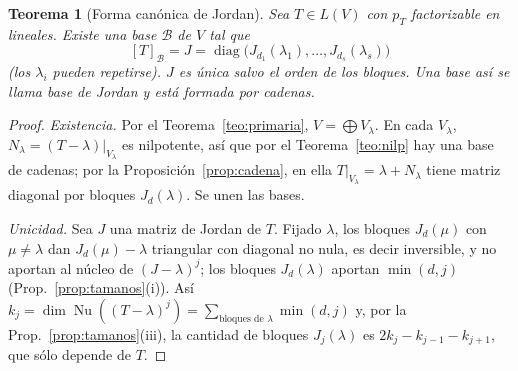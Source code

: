 \documentclass{article}
\DeclareMathOperator{\Nu}{Nu}
\theoremstyle{plain}
\newtheorem{teorema}{Teorema}[section]
\theoremstyle{definition}
\theoremstyle{remark}
\begin{document}
\begin{teorema}[Forma canónica de Jordan]\label{teo:jordan}
    Sea \(T\in L(V)\) con \(p_T\) factorizable en lineales. Existe una base \(\mathcal B\) de \(V\) tal que
    \[
        [T]_{\mathcal B}=J=\operatorname{diag}\big(J_{d_1}(\lambda_1),\dots,J_{d_s}(\lambda_s)\big)
    \]
    (los \(\lambda_i\) pueden repetirse). \(J\) es única salvo el orden de los bloques. Una base así se llama \emph{base de Jordan} y está formada por cadenas.
\end{teorema}
\begin{proof}
    \emph{Existencia.} Por el Teorema~\ref{teo:primaria}, \(V=\bigoplus V_{\lambda}\). En cada \(V_\lambda\), \(N_\lambda=(T-\lambda)|_{V_\lambda}\) es nilpotente, así que por el Teorema~\ref{teo:nilp} hay una base de cadenas; por la Proposición~\ref{prop:cadena}, en ella \(T|_{V_\lambda}=\lambda+N_\lambda\) tiene matriz diagonal por bloques \(J_d(\lambda)\). Se unen las bases.

    \emph{Unicidad.} Sea \(J\) una matriz de Jordan de \(T\). Fijado \(\lambda\), los bloques \(J_d(\mu)\) con \(\mu\ne\lambda\) dan \(J_d(\mu)-\lambda\) triangular con diagonal no nula, es decir inversible, y no aportan al núcleo de \((J-\lambda)^j\); los bloques \(J_d(\lambda)\) aportan \(\min(d,j)\) (Prop.~\ref{prop:tamanos}(i)). Así \(k_j=\dim\Nu((T-\lambda)^j)=\sum_{\text{bloques de }\lambda}\min(d,j)\) y, por la Prop.~\ref{prop:tamanos}(iii), la cantidad de bloques \(J_j(\lambda)\) es \(2k_j-k_{j-1}-k_{j+1}\), que sólo depende de \(T\).
\end{proof}
\end{document}
